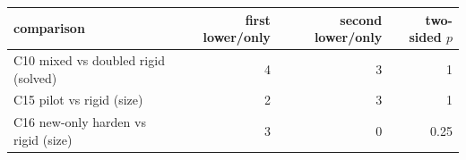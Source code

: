 \begin{tabular}{lrrr}\toprule
comparison & first lower/only & second lower/only & two-sided $p$\\\midrule
C10 mixed vs doubled rigid (solved) & 4 & 3 & 1\\
C15 pilot vs rigid (size) & 2 & 3 & 1\\
C16 new-only harden vs rigid (size) & 3 & 0 & 0.25\\
\bottomrule\end{tabular}
